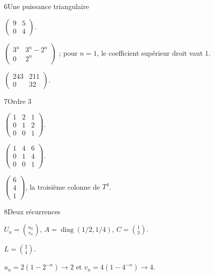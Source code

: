 \begin{corrige}{6}{Une puissance triangulaire}
\begin{questions}
\item $\begin{pmatrix}9&5\\0&4\end{pmatrix}$.
\item $\begin{pmatrix}3^n&3^n-2^n\\0&2^n\end{pmatrix}$ ; pour $n=1$, le coefficient supérieur droit vaut $1$.
\item $\begin{pmatrix}243&211\\0&32\end{pmatrix}$.
\end{questions}
\end{corrige}
\begin{corrige}{7}{Ordre $3$}
\begin{questions}
\item $\begin{pmatrix}1&2&1\\0&1&2\\0&0&1\end{pmatrix}$.
\item $\begin{pmatrix}1&4&6\\0&1&4\\0&0&1\end{pmatrix}$.
\item $\begin{pmatrix}6\\4\\1\end{pmatrix}$, la troisième colonne de $T^4$.
\end{questions}
\end{corrige}
\begin{corrige}{8}{Deux récurrences}
\begin{questions}
\item $U_n=\binom{u_n}{v_n}$, $A=\operatorname{diag}(1/2,1/4)$, $C=\binom13$.
\item $L=\binom24$.
\item $u_n=2(1-2^{-n})\to2$ et $v_n=4(1-4^{-n})\to4$.
\end{questions}
\end{corrige}
